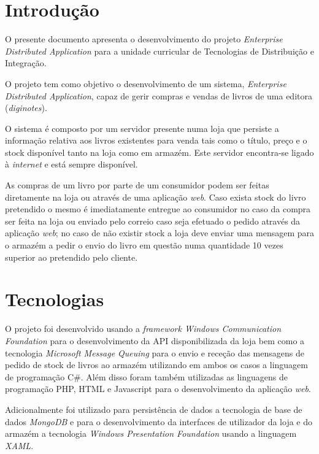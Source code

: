 \documentclass[12pt]{article}
\begin{document}
\newpage

\section{Introdução}

O presente documento apresenta o desenvolvimento do projeto \textit{Enterprise Distributed Application} para a unidade curricular de Tecnologias de Distribuição e Integração. 

O projeto tem como objetivo o desenvolvimento de um sistema, \textit{Enterprise Distributed Application}, capaz de gerir compras e vendas de livros de uma editora (\textit{diginotes}). 

O sistema é composto por um servidor presente numa loja que persiste a informação relativa aos livros existentes para venda tais como o título, preço e o stock disponível tanto na loja como em armazém. Este servidor encontra-se ligado à \textit{internet} e está sempre disponível.

As compras de um livro por parte de um consumidor podem ser feitas diretamente na loja ou através de uma aplicação \textit{web}. Caso exista stock do livro pretendido o mesmo é imediatamente entregue ao consumidor no caso da compra ser feita na loja ou enviado pelo correio caso seja efetuado o pedido através da aplicação \textit{web}; no caso de não existir stock a loja deve enviar uma mensagem para o armazém a pedir o envio do livro em questão numa quantidade 10 vezes superior ao pretendido pelo cliente.


\section{Tecnologias}

O projeto foi desenvolvido usando a \textit{framework Windows Communication Foundation} para o desenvolvimento da API disponibilizada da loja bem como a tecnologia \textit{Microsoft Message Queuing} para o envio e receção das mensagens de pedido de stock de livros ao armazém utilizando em ambos os casos a linguagem de programação C\#. Além disso foram também utilizadas as linguagens de programação PHP, HTML  e Javascript para o desenvolvimento da aplicação \textit{web}. 

Adicionalmente foi utilizado para persistência de dados a tecnologia de base de dados \textit{MongoDB} e para o desenvolvimento da interfaces de utilizador da loja e do armazém a tecnologia \textit{Windows Presentation Foundation} usando a linguagem \textit{XAML}.
\end{document}
